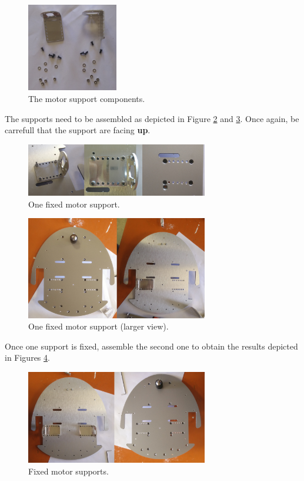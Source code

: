 \documentclass[10pt,a4paper]{report}   %
\begin{document}
\begin{figure}[H]
\center
\includegraphics[width=150px]{images/05.jpg}
\caption{The motor support components.}
\label{fig:05}
\end{figure}

The supports need to be assembled as depicted in Figure \ref{fig:06} and \ref{fig:07}. Once again, be carrefull that the support are facing \textbf{up}.

\begin{figure}[H]
\center
\includegraphics[width=300px]{images/06.jpg}
\caption{One fixed motor support.}
\label{fig:06}
\end{figure}

\begin{figure}[H]
\center
\includegraphics[width=300px]{images/07.jpg}
\caption{One fixed motor support (larger view).}
\label{fig:07}
\end{figure}

Once one support is fixed, assemble the second one to obtain the results depicted in Figures \ref{fig:08}.

\begin{figure}[H]
\center
\includegraphics[width=300px]{images/08.jpg}
\caption{Fixed motor supports.}
\label{fig:08}
\end{figure}
\end{document}
